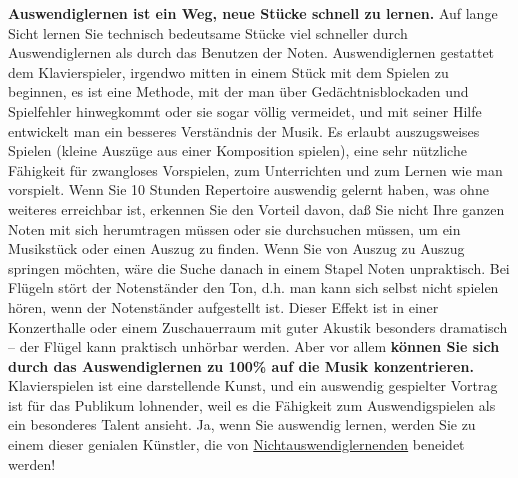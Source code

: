 \textbf{Auswendiglernen ist ein Weg, neue Stücke schnell zu lernen.}
Auf lange Sicht lernen Sie technisch bedeutsame Stücke viel schneller durch Auswendiglernen als durch das Benutzen der Noten.
Auswendiglernen gestattet dem Klavierspieler, irgendwo mitten in einem Stück mit dem Spielen zu beginnen, es ist eine Methode, mit der man über Gedächtnisblockaden und Spielfehler hinwegkommt oder sie sogar völlig vermeidet, und  mit seiner Hilfe entwickelt man ein besseres Verständnis der Musik.
Es erlaubt auszugsweises Spielen (kleine Auszüge aus einer Komposition spielen), eine sehr nützliche Fähigkeit für zwangloses Vorspielen, zum Unterrichten und zum Lernen wie man vorspielt.
Wenn Sie 10 Stunden Repertoire auswendig gelernt haben, was ohne weiteres erreichbar ist, erkennen Sie den Vorteil davon, daß Sie nicht Ihre ganzen Noten mit sich herumtragen müssen oder sie durchsuchen müssen, um ein Musikstück oder einen Auszug zu finden.
Wenn Sie von Auszug zu Auszug springen möchten, wäre die Suche danach in einem Stapel Noten unpraktisch.
Bei Flügeln stört der Notenständer den Ton, d.h. man kann sich selbst nicht spielen hören, wenn der Notenständer aufgestellt ist.
Dieser Effekt ist in einer Konzerthalle oder einem Zuschauerraum mit guter Akustik besonders dramatisch -- der Flügel kann praktisch unhörbar werden.
Aber vor allem \textbf{können Sie sich durch das Auswendiglernen zu 100\% auf die Musik konzentrieren.}
Klavierspielen ist eine darstellende Kunst, und ein auswendig gespielter Vortrag ist für das Publikum lohnender, weil es die Fähigkeit zum Auswendigspielen als ein besonderes Talent ansieht.
Ja, wenn Sie auswendig lernen, werden Sie zu einem dieser genialen Künstler, die von \hyperref[memorizer]{Nichtauswendiglernenden} beneidet werden!

